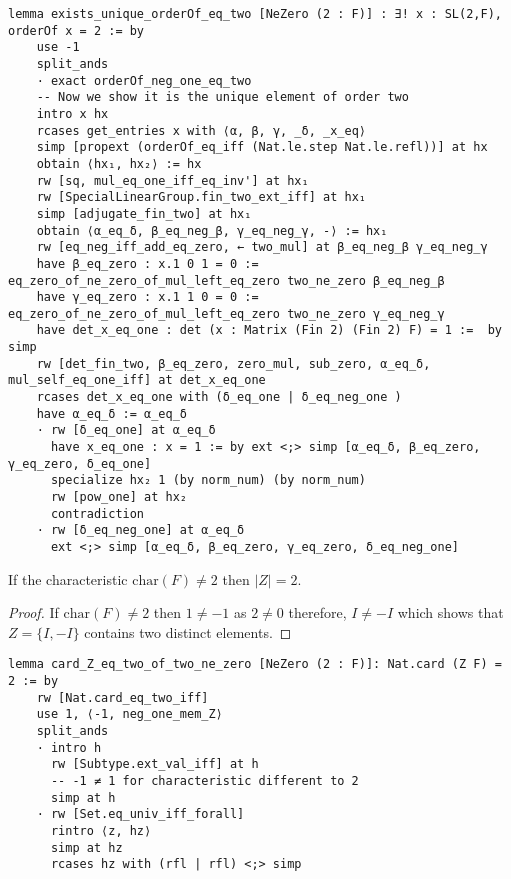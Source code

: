 \begin{footnotesize}
\begin{verbatim}
lemma exists_unique_orderOf_eq_two [NeZero (2 : F)] : ∃! x : SL(2,F), orderOf x = 2 := by
    use -1
    split_ands
    · exact orderOf_neg_one_eq_two
    -- Now we show it is the unique element of order two
    intro x hx
    rcases get_entries x with ⟨α, β, γ, _δ, _x_eq⟩
    simp [propext (orderOf_eq_iff (Nat.le.step Nat.le.refl))] at hx
    obtain ⟨hx₁, hx₂⟩ := hx
    rw [sq, mul_eq_one_iff_eq_inv'] at hx₁
    rw [SpecialLinearGroup.fin_two_ext_iff] at hx₁
    simp [adjugate_fin_two] at hx₁
    obtain ⟨α_eq_δ, β_eq_neg_β, γ_eq_neg_γ, -⟩ := hx₁
    rw [eq_neg_iff_add_eq_zero, ← two_mul] at β_eq_neg_β γ_eq_neg_γ
    have β_eq_zero : x.1 0 1 = 0 := eq_zero_of_ne_zero_of_mul_left_eq_zero two_ne_zero β_eq_neg_β
    have γ_eq_zero : x.1 1 0 = 0 := eq_zero_of_ne_zero_of_mul_left_eq_zero two_ne_zero γ_eq_neg_γ
    have det_x_eq_one : det (x : Matrix (Fin 2) (Fin 2) F) = 1 :=  by simp
    rw [det_fin_two, β_eq_zero, zero_mul, sub_zero, α_eq_δ, mul_self_eq_one_iff] at det_x_eq_one
    rcases det_x_eq_one with (δ_eq_one | δ_eq_neg_one )
    have α_eq_δ := α_eq_δ
    · rw [δ_eq_one] at α_eq_δ
      have x_eq_one : x = 1 := by ext <;> simp [α_eq_δ, β_eq_zero, γ_eq_zero, δ_eq_one]
      specialize hx₂ 1 (by norm_num) (by norm_num)
      rw [pow_one] at hx₂
      contradiction
    · rw [δ_eq_neg_one] at α_eq_δ
      ext <;> simp [α_eq_δ, β_eq_zero, γ_eq_zero, δ_eq_neg_one]
\end{verbatim}
\end{footnotesize}

\begin{lemma}
    \label{SpecialSubgroups.card_Z_eq_two_of_two_ne_zero}
    \leanok
    If the characteristic $\textrm{char}(F) \ne 2$ then $|Z| = 2$.
\end{lemma}
\begin{proof}
\leanok
    If $\textrm{char}(F) \ne 2$ then $1 \ne -1$ as $2 \ne 0$ therefore, $I \ne -I$ which shows that $Z = \{I , -I\}$ contains two distinct elements.
\end{proof}
\begin{footnotesize}
\begin{verbatim}
lemma card_Z_eq_two_of_two_ne_zero [NeZero (2 : F)]: Nat.card (Z F) = 2 := by
    rw [Nat.card_eq_two_iff]
    use 1, ⟨-1, neg_one_mem_Z⟩
    split_ands
    · intro h
      rw [Subtype.ext_val_iff] at h
      -- -1 ≠ 1 for characteristic different to 2
      simp at h
    · rw [Set.eq_univ_iff_forall]
      rintro ⟨z, hz⟩
      simp at hz
      rcases hz with (rfl | rfl) <;> simp
\end{verbatim}
\end{footnotesize}

